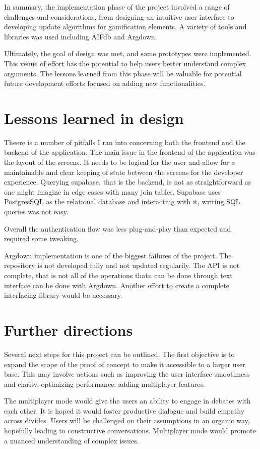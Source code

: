 \documentclass{report}
\begin{document}
In summary, the implementation phase of the project involved a range of challenges and considerations, from designing an intuitive user interface to developing update algorithms for gamification elements. A variety of tools and libraries was used including AIFdb and Argdown. 

Ultimately, the goal of design was met, and some prototypes were implemented. This venue of effort has the potential to help users better understand complex arguments. The lessons learned from this phase will be valuable for potential future development efforts focused on adding new functionalities.

\section{Lessons learned in design}
Theere is a number of pitfalls I ran into concerning both the frontend and the backend of the application. The main issue in the frontend of the application was the layout of the screens. It needs to be logical for the user and allow for a maintainable and clear keeping of state between the screens for the developer experience. Querying supabase, that is the backend, is not as straightforward as one might imagine in edge cases with many join tables. Supabase uses PostgresSQL as the relational database and interacting with it, writing SQL queries was not easy. 

Overall the authentication flow was less plug-and-play than expected and required some tweaking. 

Argdown implementation is one of the biggest failures of the project. The repository is not developed fully and not updated regularily. The API is not complete, that is not all of the operations thatn can be done through text interface can be done with Argdown. Another effort to create a complete interfacing library would be necessary.

\section{Further directions}
Several next steps for this project can be outlined. The first objective is to expand the scope of the proof of concept to make it accessible to a larger user base. This may involve actions such as improving the user interface smoothness and clarity, optimizing performance, adding multiplayer features.

The multiplayer mode would give the users an ability to engage in debates with each other. It is hoped it would foster productive dialogue and build empathy across divides.
Users will be challenged on their assumptions in an organic way, hopefully leading to constructive conversations. Multiplayer mode would promote a nuanced understanding of complex issues.
\end{document}
